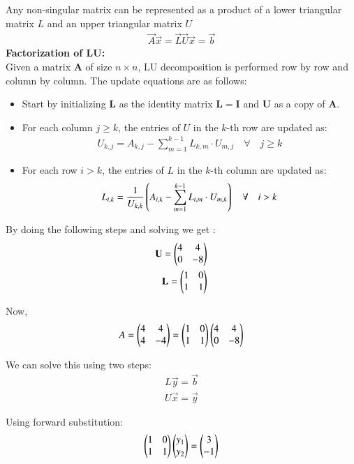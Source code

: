 \documentclass[journal]{IEEEtran}
\begin{document}
Any non-singular matrix can be represented as a product of a lower triangular matrix $L$ and an upper triangular matrix $U$
\begin{align}
	\vec{ A}\vec{x} = \vec{L}\vec{U}\vec{x} = \vec{b}
\end{align}
\textbf{Factorization of LU:}\\
Given a matrix $ \mathbf{A} $ of size $ n \times n $, LU decomposition is performed row by row and column by column. The update equations are as follows: 
\begin{itemize}
    \item Start by initializing $ \mathbf{L} $ as the identity matrix $ \mathbf{L} = \mathbf{I} $ and $ \mathbf{U} $ as a copy of $ \mathbf{A} $.\\
    \item For each column $ j \geq k $, the entries of $ U $ in the $ k $-th row are updated as:
    \begin{align}
        U_{k,j} = A_{k,j} - \sum_{m=1}^{k-1} L_{k,m} \cdot U_{m,j}\quad \forall \quad j \geq k
    \end{align}
    \item For each row $ i > k $, the entries of $ L $ in the $ k $-th column are updated as:
    \begin{align}
        L_{i,k} = \frac{1}{U_{k,k}} \left( A_{i,k} - \sum_{m=1}^{k-1} L_{i,m} \cdot U_{m,k}\right) \quad \forall \quad i > k
    \end{align}
\end{itemize}
By doing the following steps and solving we get :
\begin{align}
	\mathbf{U}=\begin{pmatrix}4 & 4\\0 & -8\end{pmatrix} \\
	\mathbf{ L} = \begin{pmatrix}1 & 0\\ 1 & 1\end{pmatrix}
\end{align}

Now,
\begin{align}
    A = \begin{pmatrix}4& 4\\4 & -4 \end{pmatrix} = \begin{pmatrix}1 & 0\\  1 & 1\end{pmatrix}\begin{pmatrix}4 & 4\\0 & -8\end{pmatrix}
\end{align}

We can solve this using two steps:
\begin{align}
    L\vec{y} = \vec{b}\\
    U\vec{x} = \vec{y}
\end{align}

Using forward substitution:
\begin{align}
    \begin{pmatrix}1 & 0\\ 1 & 1\end{pmatrix}\begin{pmatrix}y_1\\y_2\end{pmatrix} = \begin{pmatrix}3\\-1\end{pmatrix}
\end{align}
\end{document}
